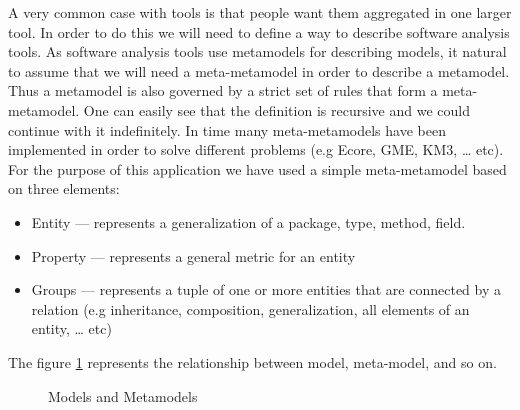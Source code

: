 	A very common case with tools is that people want them aggregated in one larger
tool. In order to do this we will need to define a way to describe software
analysis tools. As software analysis tools use metamodels for describing models,
it natural to assume that we will need a meta-metamodel in order to describe a
metamodel. Thus a metamodel is also governed by a strict set of rules that form
a meta-metamodel. One can easily see that the definition is recursive and we
could continue with it indefinitely. In time many meta-metamodels have been
implemented in order to solve different problems (e.g Ecore, GME, KM3, \ldots{}
etc). For the purpose of this application we have used a simple meta-metamodel
based on three elements: 
	\begin{itemize}
		\item Entity --- represents a generalization of a package, type, method, 
field.
 
		\item Property --- represents a general metric for an entity
		\item Groups --- represents a tuple of one or more entities that are connected
by a relation (e.g inheritance, composition, generalization, all elements of an
entity, \ldots{} etc)
	\end{itemize}
	
	The figure \ref{fig:metamodel} represents the relationship between model,
meta-model, and so on.
	 

\begin{figure}
\centering
{}
\caption{Models and Metamodels\label{fig:metamodel}}
\end{figure}
		
